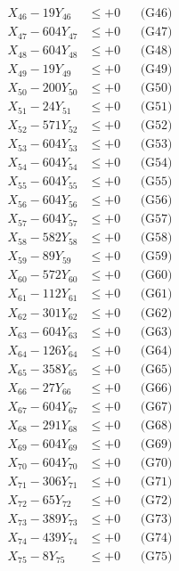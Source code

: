 \documentclass[a4paper,10pt]{article}
\begin{document}
{\begin{align}
X_{46} - 19Y_{46} &\leq +0 && \text{(G46)} \\
X_{47} - 604Y_{47} &\leq +0 && \text{(G47)} \\
X_{48} - 604Y_{48} &\leq +0 && \text{(G48)} \\
X_{49} - 19Y_{49} &\leq +0 && \text{(G49)} \\
X_{50} - 200Y_{50} &\leq +0 && \text{(G50)} \\
\allowbreak
X_{51} - 24Y_{51} &\leq +0 && \text{(G51)} \\
X_{52} - 571Y_{52} &\leq +0 && \text{(G52)} \\
X_{53} - 604Y_{53} &\leq +0 && \text{(G53)} \\
X_{54} - 604Y_{54} &\leq +0 && \text{(G54)} \\
X_{55} - 604Y_{55} &\leq +0 && \text{(G55)} \\
X_{56} - 604Y_{56} &\leq +0 && \text{(G56)} \\
X_{57} - 604Y_{57} &\leq +0 && \text{(G57)} \\
X_{58} - 582Y_{58} &\leq +0 && \text{(G58)} \\
X_{59} - 89Y_{59} &\leq +0 && \text{(G59)} \\
X_{60} - 572Y_{60} &\leq +0 && \text{(G60)} \\
\allowbreak
X_{61} - 112Y_{61} &\leq +0 && \text{(G61)} \\
X_{62} - 301Y_{62} &\leq +0 && \text{(G62)} \\
X_{63} - 604Y_{63} &\leq +0 && \text{(G63)} \\
X_{64} - 126Y_{64} &\leq +0 && \text{(G64)} \\
X_{65} - 358Y_{65} &\leq +0 && \text{(G65)} \\
X_{66} - 27Y_{66} &\leq +0 && \text{(G66)} \\
X_{67} - 604Y_{67} &\leq +0 && \text{(G67)} \\
X_{68} - 291Y_{68} &\leq +0 && \text{(G68)} \\
X_{69} - 604Y_{69} &\leq +0 && \text{(G69)} \\
X_{70} - 604Y_{70} &\leq +0 && \text{(G70)} \\
\allowbreak
X_{71} - 306Y_{71} &\leq +0 && \text{(G71)} \\
X_{72} - 65Y_{72} &\leq +0 && \text{(G72)} \\
X_{73} - 389Y_{73} &\leq +0 && \text{(G73)} \\
X_{74} - 439Y_{74} &\leq +0 && \text{(G74)} \\
X_{75} - 8Y_{75} &\leq +0 && \text{(G75)} \\

\end{align}}
\end{document}
